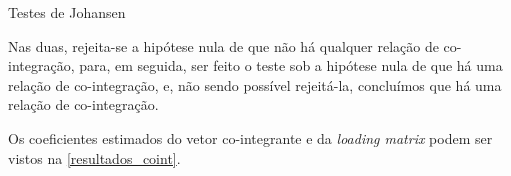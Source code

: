 \documentclass[a4paper,
               article,
               12pt,
               openany,
               oneside,
               english,
               brazil]{abntex2}
\numberwithin{equation}{section}
\begin{document}
    \begin{table}[hbt]
        \caption{Testes de Johansen}
        \begin{subtable}{.5\linewidth}
        \end{subtable}%
        \begin{subtable}{.5\linewidth}
        \end{subtable}%
    \end{table}

    Nas duas, rejeita-se a hipótese nula de que não há qualquer relação de co-integração, para, em seguida, ser feito o teste sob a hipótese nula de que há uma relação de co-integração, e, não sendo possível rejeitá-la, concluímos que há uma relação de co-integração.

    Os coeficientes estimados do vetor co-integrante e da \textit{loading matrix} podem ser vistos na \autoref{resultados_coint}. 
    
\end{document}
